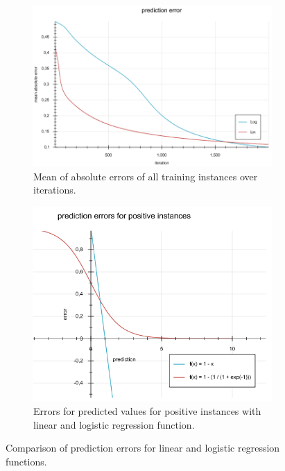\documentclass[10pt]{reportMaster}
\begin{document}
\begin{figure}[hb!]
	\begin{subfigure}{0.75\textwidth}
		\centering
		\includegraphics[width=1\textwidth]{figures/experiments/errorsLogLin43}
		\caption[Mean absolute error over iterations]{Mean of absolute errors of all training instances over iterations.}
		\label{fig:errorsLogLin43}
	\end{subfigure}
	\begin{subfigure}{0.75\textwidth}
		\centering
		\includegraphics[width=1\textwidth]{figures/experiments/predictionErrors}
		\caption[Error of positive instances for different predictions]{Errors for predicted values for positive instances with linear and logistic regression function.}
		\label{fig:predictionErrors}
	\end{subfigure}
	\caption[Comparison of prediction errors for linear and logistic regression]{Comparison of prediction errors for linear and logistic regression functions.}
	\label{fig:errors}
\end{figure}
\end{document}
